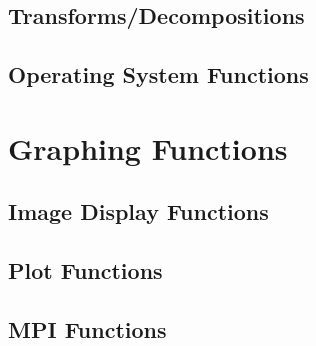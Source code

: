 \documentclass{book}
\begin{document}
\section{Transforms/Decompositions}



\section{Operating System Functions}






\chapter{Graphing Functions}
\section{Image Display Functions}










\section{Plot Functions}












\section{MPI Functions}













\end{document}
